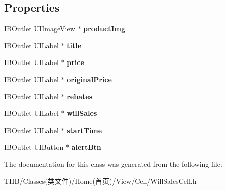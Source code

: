 \subsection*{Properties}
\begin{DoxyCompactItemize}
\item 
\mbox{\label{interface_will_sales_cell_acb5ae3a145f41ba7bd7fbda822e9a55a}} 
I\+B\+Outlet U\+I\+Image\+View $\ast$ {\bfseries product\+Img}
\item 
\mbox{\label{interface_will_sales_cell_a67e4de7be6b7df5e7feeb6849d7d2e1f}} 
I\+B\+Outlet U\+I\+Label $\ast$ {\bfseries title}
\item 
\mbox{\label{interface_will_sales_cell_aba95480718f4e7fdcfba7c11035e809a}} 
I\+B\+Outlet U\+I\+Label $\ast$ {\bfseries price}
\item 
\mbox{\label{interface_will_sales_cell_a991357f96175fa9f4e6f918d168887fc}} 
I\+B\+Outlet U\+I\+Label $\ast$ {\bfseries original\+Price}
\item 
\mbox{\label{interface_will_sales_cell_ab1caafef9d4ba310b5f5838765070018}} 
I\+B\+Outlet U\+I\+Label $\ast$ {\bfseries rebates}
\item 
\mbox{\label{interface_will_sales_cell_a2d998a2e3c52bd279eba1fede47b9315}} 
I\+B\+Outlet U\+I\+Label $\ast$ {\bfseries will\+Sales}
\item 
\mbox{\label{interface_will_sales_cell_aef10eaaa8c66604967bab44a5617358d}} 
I\+B\+Outlet U\+I\+Label $\ast$ {\bfseries start\+Time}
\item 
\mbox{\label{interface_will_sales_cell_a8e13de5b87cc4682359c6f1f1ae51496}} 
I\+B\+Outlet U\+I\+Button $\ast$ {\bfseries alert\+Btn}
\end{DoxyCompactItemize}


The documentation for this class was generated from the following file\+:\begin{DoxyCompactItemize}
\item 
T\+H\+B/\+Classes(类文件)/\+Home(首页)/\+View/\+Cell/Will\+Sales\+Cell.\+h\end{DoxyCompactItemize}
